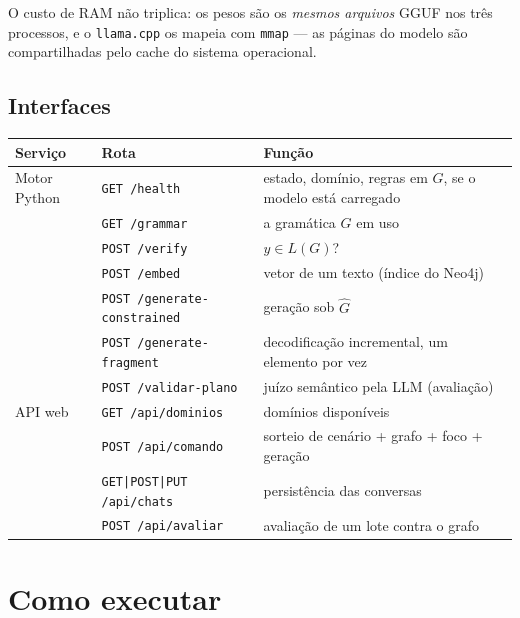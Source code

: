 \documentclass[11pt,a4paper]{article}
\begin{document}
O custo de RAM não triplica: os pesos são os \emph{mesmos arquivos} GGUF nos três
processos, e o \texttt{llama.cpp} os mapeia com \texttt{mmap} --- as páginas do
modelo são compartilhadas pelo cache do sistema operacional.

\subsection{Interfaces}

\begin{center}
\small
\begin{tabular}{@{}llp{7.8cm}@{}}
\toprule
\textbf{Serviço} & \textbf{Rota} & \textbf{Função}\\
\midrule
Motor Python & \texttt{GET /health}   & estado, domínio, regras em $G$, se o modelo está carregado\\
             & \texttt{GET /grammar}  & a gramática $G$ em uso\\
             & \texttt{POST /verify}  & $y \in L(G)$?\\
             & \texttt{POST /embed}   & vetor de um texto (índice do Neo4j)\\
             & \texttt{POST /generate-constrained} & geração sob $\hat{G}$\\
             & \texttt{POST /generate-fragment}    & decodificação incremental, um elemento por vez\\
             & \texttt{POST /validar-plano}        & juízo semântico pela LLM (avaliação)\\
\midrule
API web      & \texttt{GET /api/dominios} & domínios disponíveis\\
             & \texttt{POST /api/comando} & sorteio de cenário + grafo + foco + geração\\
             & \texttt{GET|POST|PUT /api/chats} & persistência das conversas\\
             & \texttt{POST /api/avaliar} & avaliação de um lote contra o grafo\\
\bottomrule
\end{tabular}
\end{center}

\section{Como executar}
\end{document}
